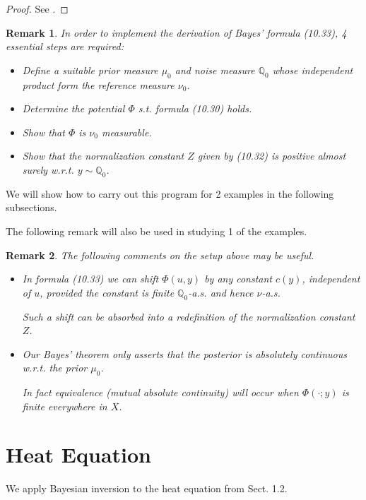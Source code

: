 \documentclass[oneside,11pt]{book}
\numberwithin{equation}{section}
\newtheorem{remark}{Remark}[section]
\begin{document}
\begin{proof}
    See \cite[p. 343]{Dashti_Stuart2017}.
\end{proof}

\begin{remark}
    In order to implement the derivation of Bayes' formula (10.33), 4 essential steps are required:
    \begin{itemize}
        \item Define a suitable prior measure $\mu_0$ and noise measure $\mathbb{Q}_0$ whose independent product form the reference measure $\nu_0$.
        \item Determine the potential $\Phi$ s.t. formula (10.30) holds.
        \item Show that $\Phi$ is $\nu_0$ measurable.
        \item Show that the normalization constant $Z$ given by (10.32) is positive almost surely w.r.t. $y\sim\mathbb{Q}_0$.
    \end{itemize}
\end{remark}
We will show how to carry out this program for 2 examples in the following subsections.

The following remark will also be used in studying 1 of the examples.

\begin{remark}
    The following comments on the setup above may be useful.
    \begin{itemize}
        \item In formula (10.33) we can shift $\Phi(u,y)$ by any constant $c(y)$, independent of $u$, provided the constant is finite $\mathbb{Q}_0$-a.s. and hence $\nu$-a.s.
        
        Such a shift can be absorbed into a redefinition of the normalization constant $Z$.
        \item Our Bayes' theorem only asserts that the posterior is absolutely continuous w.r.t. the prior $\mu_0$.
        
        In fact equivalence (mutual absolute continuity) will occur when $\Phi(\cdot;y)$ is finite everywhere in $X$.
    \end{itemize}
\end{remark}

\section{Heat Equation}
We apply Bayesian inversion to the heat equation from Sect. 1.2.
\end{document}
